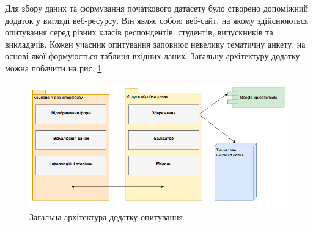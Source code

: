 Для збору даних та формування початкового датасету було створено допоміжний додаток у вигляді веб-ресурсу. Він являє собою веб-сайт, на якому здійснюються опитування серед різних класів респондентів: студентів, випускників та викладачів. Кожен учасник опитування заповнює невелику тематичну анкету, на основі якої формуюється таблиця вхідних даних. Загальну архітектуру додатку можна побачити на рис. \ref{fig:poll_architecture} 

\begin{figure}[h!]
  \includegraphics[width=\linewidth]{figures/poll_architecture.png}
  \caption{Загальна архітектура додатку опитування}
  \label{fig:poll_architecture}
\end{figure}

